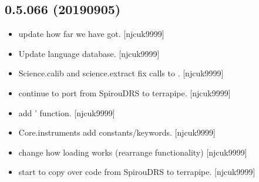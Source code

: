 \documentclass[a4paper,10pt,english]{report}
\begin{document}
\subsection{0.5.066 (2019\sphinxhyphen{}09\sphinxhyphen{}05)}
\label{\detokenize{misc/changelog:id95}}\begin{itemize}
\item {} 
 \sphinxhyphen{} update how far we have got. {[}njcuk9999{]}

\item {} 
Update language database. {[}njcuk9999{]}

\item {} 
Science.calib and science.extract \sphinxhyphen{} fix calls to .
{[}njcuk9999{]}

\item {} 
 \sphinxhyphen{} continue to port from SpirouDRS to
terrapipe. {[}njcuk9999{]}

\item {} 
 \sphinxhyphen{} add ’ function. {[}njcuk9999{]}

\item {} 
Core.instruments \sphinxhyphen{} add  constants/keywords. {[}njcuk9999{]}

\item {} 
 \sphinxhyphen{} change how loading works (rearrange
functionality) {[}njcuk9999{]}

\item {} 
 \sphinxhyphen{} start to copy over code from SpirouDRS to
terrapipe. {[}njcuk9999{]}

\end{itemize}
\end{document}
